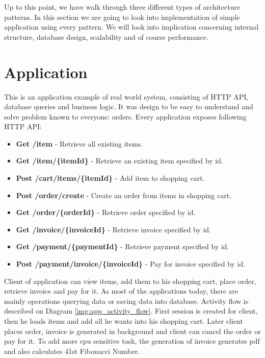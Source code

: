 

Up to this point, we have walk through three different types of architecture patterns. In this section we are going to look into implementation of simple application using every pattern. We will look into implication concerning internal structure, database design, scalability and of course performance.

\section{Application}
This is an application example of real world system, consisting of HTTP API, database queries and business logic. It was design to be easy to understand and solve problem known to everyone: orders. Every application exposes following HTTP API:
\begin{itemize}
    \item \textbf{Get /item} - Retrieve all existing items.
    \item \textbf{Get /item/\{itemId\}} - Retrieve an existing item specified by id.
    \item \textbf{Post /cart/items/\{itemId\}} - Add item to shopping cart.
    \item \textbf{Post /order/create} - Create an order from items in shopping cart.
    \item \textbf{Get /order/\{orderId\}} - Retrieve order specified by id.
    \item \textbf{Get /invoice/\{invoiceId\}} - Retrieve invoice specified by id.
    \item \textbf{Get /payment/\{paymentId\}} - Retrieve payment specified by id.
    \item \textbf{Post /payment/invoice/\{invoiceId\}} - Pay for invoice specified by id.
\end{itemize}

Client of application can view items, add them to his shopping cart, place order, retrieve invoice and pay for it. As most of the applications today, there are mainly operations querying data or saving data into database. Activity flow is described on Diagram \ref{img:app_activity_flow}. First session is created for client, then he loads items and add all he wants into his shopping cart. Later client places order, invoice is generated in background and client can cancel the order or pay for it. To add more cpu sensitive task, the generation of invoice generates pdf and also calculates 41st Fibonacci Number.

